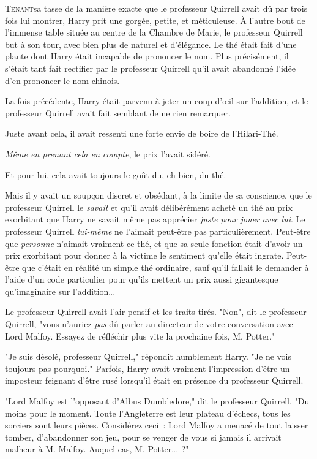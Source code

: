 
\lettrine{T}{enant}sa tasse de la manière exacte que le professeur Quirrell avait dû par trois fois lui montrer, Harry prit une gorgée, petite, et méticuleuse. À l'autre bout de l'immense table située au centre de la Chambre de Marie, le professeur Quirrell but à son tour, avec bien plus de naturel et d'élégance. Le thé était fait d'une plante dont Harry était incapable de prononcer le nom. Plus précisément, il s'était tant fait rectifier par le professeur Quirrell qu'il avait abandonné l'idée d'en prononcer le nom chinois.

La fois précédente, Harry était parvenu à jeter un coup d'œil sur l'addition, et le professeur Quirrell avait fait semblant de ne rien remarquer.

Juste avant cela, il avait ressenti une forte envie de boire de l'Hilari-Thé.

\emph{Même en prenant cela en compte}, le prix l'avait sidéré.

Et pour lui, cela avait toujours le goût du, eh bien, du thé.

Mais il y avait un soupçon discret et obsédant, à la limite de sa conscience, que le professeur Quirrell le \emph{savait} et qu'il avait délibérément acheté un thé au prix exorbitant que Harry ne savait même pas apprécier \emph{juste pour jouer avec lui}. Le professeur Quirrell \emph{lui-même} ne l'aimait peut-être pas particulièrement. Peut-être que \emph{personne} n'aimait vraiment ce thé, et que sa seule fonction était d'avoir un prix exorbitant pour donner à la victime le sentiment qu'elle était ingrate. Peut-être que c'était en réalité un simple thé ordinaire, sauf qu'il fallait le demander à l'aide d'un code particulier pour qu'ils mettent un prix aussi gigantesque qu'imaginaire sur l'addition…

Le professeur Quirrell avait l'air pensif et les traits tirés. "Non", dit le professeur Quirrell, "vous n'auriez \emph{pas} dû parler au directeur de votre conversation avec Lord Malfoy. Essayez de réfléchir plus vite la prochaine fois, M. Potter."

"Je suis désolé, professeur Quirrell," répondit humblement Harry. "Je ne vois toujours pas pourquoi." Parfois, Harry avait vraiment l'impression d'être un imposteur feignant d'être rusé lorsqu'il était en présence du professeur Quirrell.

"Lord Malfoy est l'opposant d'Albus Dumbledore," dit le professeur Quirrell. "Du moins pour le moment. Toute l'Angleterre est leur plateau d'échecs, tous les sorciers sont leurs pièces. Considérez ceci~: Lord Malfoy a menacé de tout laisser tomber, d'abandonner son jeu, pour se venger de vous si jamais il arrivait malheur à M. Malfoy. Auquel cas, M. Potter…~?"

